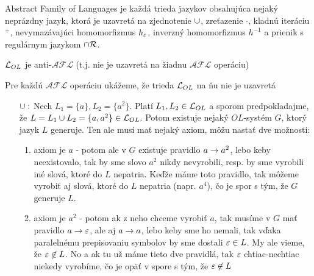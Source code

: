 
\begin{definicia}
    Abstract Family of Languages je každá trieda
    jazykov obsahujúca nejaký neprázdny jazyk, ktorá je uzavretá na
    zjednotenie $\cup$, zreťazenie $\cdot$, kladnú iteráciu $^+$,
    nevymazávajúci homomorfizmus $h_{\varepsilon}$,
    inverzný homomorfizmus $h^{-1}$ a prienik s regulárnym jazykom
    $\cap \mathcal{R}$.
\end{definicia}

\begin{veta}
    $\mathcal{L}_{OL}$ je anti-$\mathcal{AFL}$ (t.j. nie je uzavretá
    na žiadnu $\mathcal{AFL}$ operáciu)
\end{veta}

\begin{dokaz}
    Pre každú $\mathcal{AFL}$ operáciu ukážeme, že trieda
    $\mathcal{L}_{OL}$ na ňu nie je uzavretá

    \begin{itemize}
    \item[$\cup:$] Nech $L_1 = \{ a \}, L_2=\{ a^2 \}$.
        Platí $L_1,L_2 \in \mathcal{L}_{OL}$ a sporom
        predpokladajme, že $L=L_1 \cup L_2 = \{ a, a^2 \}\in \mathcal{L}_{OL}$.
        Potom existuje nejaký $OL$-systém $G$, ktorý jazyk $L$
        generuje. Ten ale musí mať nejaký axiom, môžu nastať dve možnosti:
        \begin{enumerate}
        \item axiom je $a$ - potom ale v $G$ existuje pravidlo 
            $a\rightarrow a^2$,
            lebo keby neexistovalo, tak by sme slovo $a^2$ nikdy
            nevyrobili, resp. by sme vyrobili iné slová, ktoré do $L$
            nepatria. Keďže máme toto pravidlo, tak môžeme vyrobiť aj slová,
            ktoré do $L$ nepatria (napr. $a^4$), čo je spor s tým, že
            $G$ generuje $L$.

        \item axiom je $a^{2}$ - potom ak z neho chceme vyrobiť $a$, tak
            musíme v $G$ mať pravidlo $a\rightarrow\varepsilon$,
            ale aj $a\rightarrow a$, lebo
            keby sme ho nemali, tak vďaka paralelnému prepisovaniu symbolov by
            sme dostali $\varepsilon \in L$. My ale vieme, že
            $\varepsilon\not\in L$. No a ak tu už máme tieto dve pravidlá, tak
            $\varepsilon$ chtiac-nechtiac niekedy vyrobíme, čo je opäť v spore
            s tým, že $\varepsilon\not\in L$
        \end{enumerate}


\end{itemize}
\end{dokaz}
